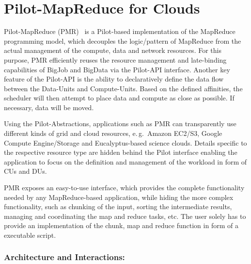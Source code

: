 \documentclass[times]{cpeauth}
\newcommand{\pilot}{Pilot\xspace}
\newcommand{\computeunits}{Compute-Units\xspace}
\newcommand{\dataunits}{Data-Units\xspace}
\newcommand{\dus}{DUs\xspace}
\newcommand{\cus}{CUs\xspace}
\begin{document}
\section{Pilot-MapReduce for Clouds}
\label{sec:pmr}

Pilot-MapReduce (PMR)~\cite{Mantha:2012:PEF:2287016.2287020} is a \pilot-based
implementation of the MapReduce programming model, which decouples the
logic/pattern of MapReduce from the actual management of the compute, data and
network resources. For this purpose, PMR efficiently reuses the resource
management and late-binding capabilities of BigJob and BigData via the 
\pilot-API interface. Another key feature of the \pilot-API is the ability to 
declaratively define the data flow between the \dataunits and \computeunits. 
Based on the defined affinities, the scheduler will then attempt to place data 
and compute as close as possible. If necessary, data will be moved. 

Using the \pilot-Abstractions, applications such as PMR can transparently use
different kinds of grid and cloud resources, e.\,g.\ Amazon EC2/S3, Google
Compute Engine/Storage and Eucalyptus-based science clouds. Details specific
to the respective resource type are hidden behind the \pilot interface
enabling the application to focus on the definition and management of the
workload in form of \cus and \dus.

PMR exposes an easy-to-use interface, which provides the complete
functionality needed by any MapReduce-based application, while hiding the more
complex functionality, such as chunking of the input, sorting the intermediate
results, managing and coordinating the map and reduce tasks, etc. The user
solely has to provide an implementation of the chunk, map and reduce function
in form of a executable script.

\subsubsection*{Architecture and Interactions:}
\end{document}
